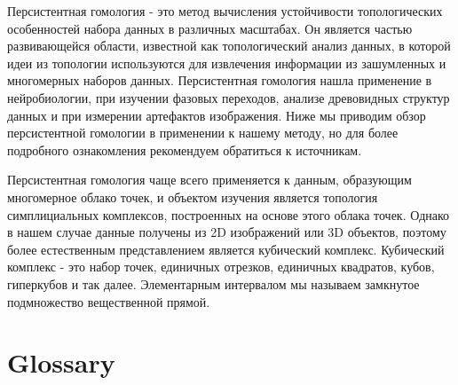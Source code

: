 \documentclass[12pt,a4paper]{article}
\begin{document}
Персистентная гомология - это метод вычисления устойчивости
топологических особенностей набора данных в различных масштабах.
Он является частью развивающейся области, известной как топологический анализ данных, в которой идеи из топологии 
используются для извлечения информации из зашумленных и многомерных наборов данных. Персистентная гомология нашла применение в нейробиологии, 
при изучении фазовых переходов,  анализе древовидных структур данных и при измерении артефактов изображения. 
Ниже мы приводим обзор персистентной гомологии в применении к нашему методу, но для более подробного ознакомления рекомендуем обратиться к источникам.

Персистентная гомология чаще всего применяется к данным, образующим многомерное облако точек, и объектом изучения является топология симплициальных
комплексов, построенных на основе этого облака точек. Однако в нашем случае данные получены из 2D изображений или 3D объектов, поэтому более естественным 
представлением является кубический комплекс. Кубический комплекс - это набор точек, единичных отрезков, единичных квадратов, кубов, гиперкубов и так далее.
Элементарным интервалом мы называем замкнутое подмножество вещественной прямой.

\newpage
\section*{Glossary}
\end{document}
